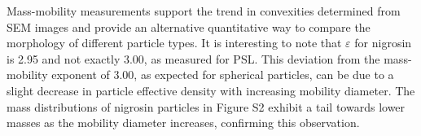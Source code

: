 Mass-mobility measurements support the trend in convexities determined from SEM images and provide an alternative quantitative way to compare the morphology of different particle types. It is interesting to note that $\varepsilon$ for nigrosin is 2.95 and not exactly 3.00, as measured for PSL. This deviation from the mass-mobility exponent of 3.00, as expected for spherical particles, can be due to a slight decrease in particle effective density with increasing mobility diameter. The mass distributions of nigrosin particles in Figure S2 exhibit a tail towards lower masses as the mobility diameter increases, confirming this observation.
